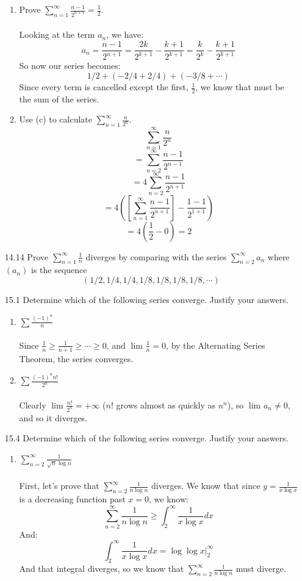 \begin{enumerate}
\begin{enumerate}
      \item Prove $\sum_{n=1}^\infty \frac{n-1}{2^{n+1}} = \frac{1}{2}$.\\\\
        
        Looking at the term $a_n$, we have:
        $$a_n = \frac{n-1}{2^{n+1}} = \frac{2k}{2^{k+1}} - \frac{k+1}{2^{k+1}} = \frac{k}{2^k} - \frac{k+1}{2^{k+1}}$$
        So now our series becomes:
        $$1/2 + (-2/4 + 2/4) + (-3/8 + \cdots)$$
        Since every term is cancelled except the first, $\frac{1}{2}$, we know that must be the sum of the series.
        
      \item Use (c) to calculate $\sum_{n=1}^\infty \frac{n}{2^n}$.
        $$\sum_{n=1}^\infty \frac{n}{2^n}$$
        $$= \sum_{n=2}^\infty \frac{n-1}{2^{n-1}}$$
        $$= 4 \sum_{n=2}^\infty \frac{n-1}{2^{n+1}}$$
        $$= 4 ([\sum_{n=1}^\infty \frac{n-1}{2^{n+1}}] - \frac{1-1}{2^{1+1}})$$
        $$= 4(\frac{1}{2} - 0) = 2$$
    \end{enumerate}
  \item [14.14]
    Prove $\sum_{n=1}^\infty \frac{1}{n}$ diverges by comparing with the series $\sum_{n=2}^\infty a_n$ where $(a_n)$ is the sequence
    $$(1/2,1/4,1/4,1/8,1/8,1/8,1/8,\cdots)$$
  \item [15.1]
    Determine which of the following series converge. Justify your answers.
    \begin{enumerate}
      \item $\sum \frac{(-1)^n}{n}$\\\\
        Since $\frac{1}{n} \geq \frac{1}{n+1} \geq \cdots \geq 0$, and $\lim_{} \frac{1}{n} = 0$, by the Alternating Series Theorem, the series converges.
      \item $\sum \frac{(-1)^n n!}{2^n}$\\\\

        Clearly $\lim_{} \frac{n!}{2^n} = + \infty$ ($n!$ grows almost as quickly as $n^n$), so $\lim_{} a_n \neq 0$, and so it diverges.
    \end{enumerate}
  \item [15.4]
    Determine which of the following series converge. Justify your answers.
    \begin{enumerate}
      \item $\sum_{n=2}^\infty \frac{1}{\sqrt{n} \log n}$\\\\
        First, let's prove that $\sum_{n=2}^\infty \frac{1}{n \log n}$ diverges. We know that since $y = \frac{1}{x \log x}$ is a decreasing function past $x = 0$, we know:
        $$\sum_{n=2}^\infty \frac{1}{n \log n} \geq \int_{2}^\infty \frac{1}{x \log x} dx$$
        And:
        $$\int_{2}^\infty \frac{1}{x \log x} dx = \log \log x |_{2}^\infty $$
        And that integral diverges, so we know that $\sum_{n=2}^\infty \frac{1}{n \log n}$ must diverge.\\


\end{enumerate}
\end{enumerate}
